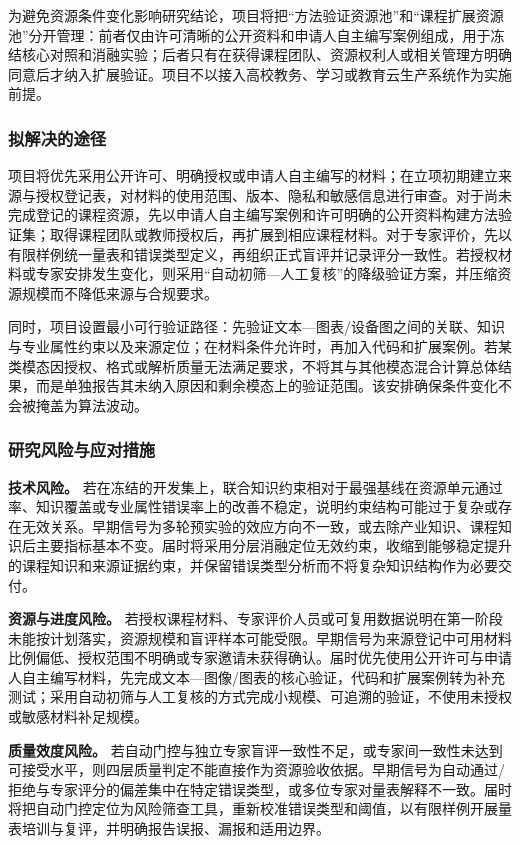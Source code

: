 为避免资源条件变化影响研究结论，项目将把“方法验证资源池”和“课程扩展资源池”分开管理：前者仅由许可清晰的公开资料和申请人自主编写案例组成，用于冻结核心对照和消融实验；后者只有在获得课程团队、资源权利人或相关管理方明确同意后才纳入扩展验证。项目不以接入高校教务、学习或教育云生产系统作为实施前提。

\subsubsection{拟解决的途径}

项目将优先采用公开许可、明确授权或申请人自主编写的材料；在立项初期建立来源与授权登记表，对材料的使用范围、版本、隐私和敏感信息进行审查。对于尚未完成登记的课程资源，先以申请人自主编写案例和许可明确的公开资料构建方法验证集；取得课程团队或教师授权后，再扩展到相应课程材料。对于专家评价，先以有限样例统一量表和错误类型定义，再组织正式盲评并记录评分一致性。若授权材料或专家安排发生变化，则采用“自动初筛—人工复核”的降级验证方案，并压缩资源规模而不降低来源与合规要求。

同时，项目设置最小可行验证路径：先验证文本—图表/设备图之间的关联、知识与专业属性约束以及来源定位；在材料条件允许时，再加入代码和扩展案例。若某类模态因授权、格式或解析质量无法满足要求，不将其与其他模态混合计算总体结果，而是单独报告其未纳入原因和剩余模态上的验证范围。该安排确保条件变化不会被掩盖为算法波动。

\subsubsection{研究风险与应对措施}

\textbf{技术风险。} 若在冻结的开发集上，联合知识约束相对于最强基线在资源单元通过率、知识覆盖或专业属性错误率上的改善不稳定，说明约束结构可能过于复杂或存在无效关系。早期信号为多轮预实验的效应方向不一致，或去除产业知识、课程知识后主要指标基本不变。届时将采用分层消融定位无效约束，收缩到能够稳定提升的课程知识和来源证据约束，并保留错误类型分析而不将复杂知识结构作为必要交付。

\textbf{资源与进度风险。} 若授权课程材料、专家评价人员或可复用数据说明在第一阶段未能按计划落实，资源规模和盲评样本可能受限。早期信号为来源登记中可用材料比例偏低、授权范围不明确或专家邀请未获得确认。届时优先使用公开许可与申请人自主编写材料，先完成文本—图像/图表的核心验证，代码和扩展案例转为补充测试；采用自动初筛与人工复核的方式完成小规模、可追溯的验证，不使用未授权或敏感材料补足规模。

\textbf{质量效度风险。} 若自动门控与独立专家盲评一致性不足，或专家间一致性未达到可接受水平，则四层质量判定不能直接作为资源验收依据。早期信号为自动通过/拒绝与专家评分的偏差集中在特定错误类型，或多位专家对量表解释不一致。届时将把自动门控定位为风险筛查工具，重新校准错误类型和阈值，以有限样例开展量表培训与复评，并明确报告误报、漏报和适用边界。

